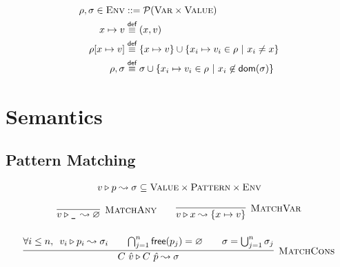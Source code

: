 \documentclass{article}
\def\tsc#1{\textsc{#1}}
\def\matchj#1#2#3{#1 \triangleright #2 \leadsto #3}
\def\defeq{\overset{\textsf{def}}{\equiv}}
\begin{document}
\begin{align*}
\rho,\sigma \in \textsc{Env} &::= \mathcal{P}(\textsc{Var} \times \textsc{Value})\\
x\mapsto v &\defeq (x,v)\\
\rho[x \mapsto v] &\defeq \{x\mapsto v\}\cup\{x_i \mapsto v_i \in \rho \ | \ x_i \neq x \}\\
\rho,\sigma &\defeq \sigma \cup \{x_i\mapsto v_i \in \rho \ | \ x_i\not\in \textsf{dom}(\sigma)\}
\end{align*}




%
%



\pagebreak

\section*{Semantics}

\subsection*{Pattern Matching}

\begin{gather*}
\matchj v p \sigma \subseteq \textsc{Value} \times \textsc{Pattern} \times \textsc{Env}
\end{gather*}


\begin{gather*}
\infer[\tsc{MatchAny}]{\matchj v {\texttt{\_}\,} \varnothing}{}\qquad
\infer[\tsc{MatchVar}]{\matchj v x {\{x\mapsto v\}}}{}\\[12pt]
\infer[\tsc{MatchCons}]{\matchj {C\ \hat{v}} {C\ \hat{p}} \sigma}{\forall i \leq n,\ \, \matchj{v_i}{p_i}{\sigma_i} && \bigcap_{j=1}^n \textsf{free}(p_j)=\varnothing && \sigma = \bigcup_{j=1}^n \sigma_j}	
\end{gather*}
\end{document}
